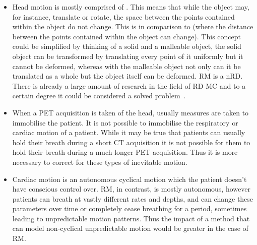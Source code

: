         \begin{itemize}
            \item Head motion is mostly comprised of . This means that while the object may, for instance, translate or rotate, the space between the points contained within the object do not change. This is in comparison to  (where the distance between the points contained within the object can change). This concept could be simplified by thinking of a solid and a malleable object, the solid object can be transformed by translating every point of it uniformly but it cannot be deformed, whereas with the malleable object not only can it be translated as a whole but the object itself can be deformed. \gls{RM} is a \gls{nRD}. There is already a large amount of research in the field of \gls{RD} \gls{MC} and to a certain degree it could be considered a solved problem~\parencite{Hill2001}.
                
            \item When a \gls{PET} acquisition is taken of the head, usually measures are taken to immobilise the patient. It is not possible to immobilise the respiratory or cardiac motion of a patient. While it may be true that patients can usually hold their breath during a short \gls{CT} acquisition it is not possible for them to hold their breath during a much longer \gls{PET} acquisition. Thus it is more necessary to correct for these types of inevitable motion.
    
            \item Cardiac motion is an autonomous cyclical motion which the patient doesn't have conscious control over. \gls{RM}, in contrast, is mostly autonomous, however patients can breath at vastly different rates and depths, and can change these parameters over time or completely cease breathing for a period, sometimes leading to unpredictable motion patterns. %
            Thus the impact of a method that can model non-cyclical unpredictable motion would be greater in the case of \gls{RM}.
        \end{itemize}
    
